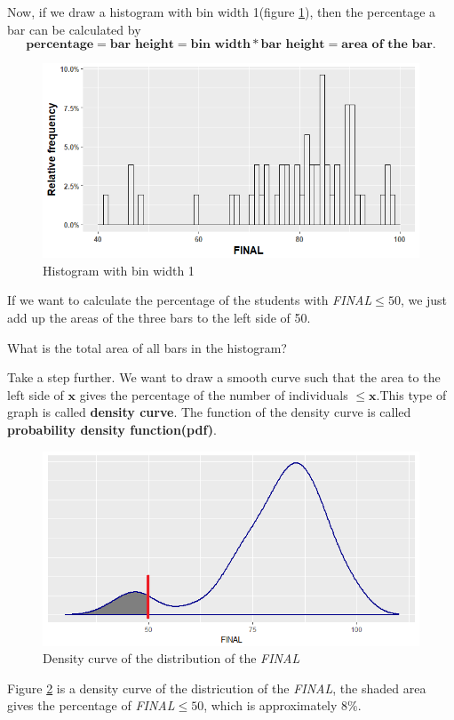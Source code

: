 \documentclass[a4paper, 12pt,twoside]{book}
\begin{document}
\begin{itemize}
Now, if we draw a histogram with bin width 1(figure \ref{HistogramBinWidth1}), then the percentage a bar can be calculated by
$$\textbf{percentage} = \textbf{bar height} = \textbf{bin width} * \textbf{bar height} = \textbf{area of the bar}.$$

\begin{figure}[H]
\centering
\includegraphics[scale=0.45]{Histogram3.png}
\caption{Histogram  with bin width 1}
\label{HistogramBinWidth1}
\end{figure}
If we want to calculate the percentage of the students with \textit{FINAL}$\leq 50$, we just add up the areas of the three bars to the left side of 50. 

\colorbox{dollarbill}{\parbox{15.2cm}{What is the total area of all bars in the histogram?}}
\vspace{1cm}

Take a step further. We want to draw a smooth curve such that the area to the left side of $\mathbf{x}$ gives the percentage of the number of individuals $\leq \mathbf{x}$.This type of graph is called \textbf{density curve}. The function of the density curve is called \textbf{probability density function(pdf)}.
\begin{figure}[H]
\centering
\includegraphics[scale=0.45]{DensityCurve.png}
\caption{Density curve of the distribution of the \textit{FINAL}}
\label{DensityCurve}
\end{figure}
Figure \ref{DensityCurve} is a density curve of the districution of the \textit{FINAL}, the shaded area gives the percentage of \textit{FINAL}$\leq 50$, which is approximately $8\%$.


\end{itemize}
\end{document}
